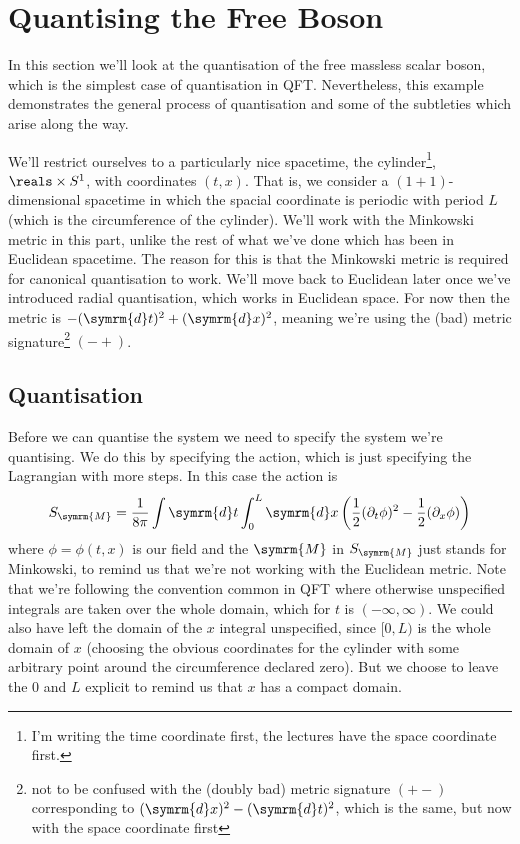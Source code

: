 \documentclass[fleqn]{NotesClass}
\renewcommand{\dl}[1]{\symrm{d}#1}
\newcommand{\minkowski}{\symrm{M}}
\begin{document}
    \chapter{Quantising the Free Boson}
    In this section we'll look at the quantisation of the free massless scalar boson, which is the simplest case of quantisation in QFT.
    Nevertheless, this example demonstrates the general process of quantisation and some of the subtleties which arise along the way.
    
    We'll restrict ourselves to a particularly nice spacetime, the cylinder\footnote{I'm writing the time coordinate first, the lectures have the space coordinate first.}, \(\reals \times S^1\), with coordinates \((t, x)\).
    That is, we consider a \((1 + 1)\)-dimensional spacetime in which the spacial coordinate is periodic with period \(L\) (which is the circumference of the cylinder).
    We'll work with the Minkowski metric in this part, unlike the rest of what we've done which has been in Euclidean spacetime.
    The reason for this is that the Minkowski metric is required for canonical quantisation to work.
    We'll move back to Euclidean later once we've introduced radial quantisation, which works in Euclidean space.
    For now then the metric is \(-(\dl{t})^2 + (\dl{x})^2\), meaning we're using the (bad) metric signature\footnote{not to be confused with the (doubly bad) metric signature \(({+}{-})\) corresponding to \((\dl x)^2 - (\dl t)^2\), which is the same, but now with the space coordinate first} \(({-}{+})\).
    
    \section{Quantisation}
    Before we can quantise the system we need to specify the system we're quantising.
    We do this by specifying the action, which is just specifying the Lagrangian with more steps.
    In this case the action is
    \begin{equation}
        S_{\minkowski} = \frac{1}{8\pi} \int \dl{t} \int_0^L \dl{x} \left( \frac{1}{2}(\partial_t\phi)^2 - \frac{1}{2}(\partial_x\phi) \right)
    \end{equation}
    where \(\phi = \phi(t, x)\) is our field and the \(\minkowski\) in \(S_{\minkowski}\) just stands for Minkowski, to remind us that we're not working with the Euclidean metric.
    Note that we're following the convention common in QFT where otherwise unspecified integrals are taken over the whole domain, which for \(t\) is \((-\infty, \infty)\).
    We could also have left the domain of the \(x\) integral unspecified, since \([0, L)\) is the whole domain of \(x\) (choosing the obvious coordinates for the cylinder with some arbitrary point around the circumference declared zero).
    But we choose to leave the \(0\) and \(L\) explicit to remind us that \(x\) has a compact domain.
    
\end{document}
